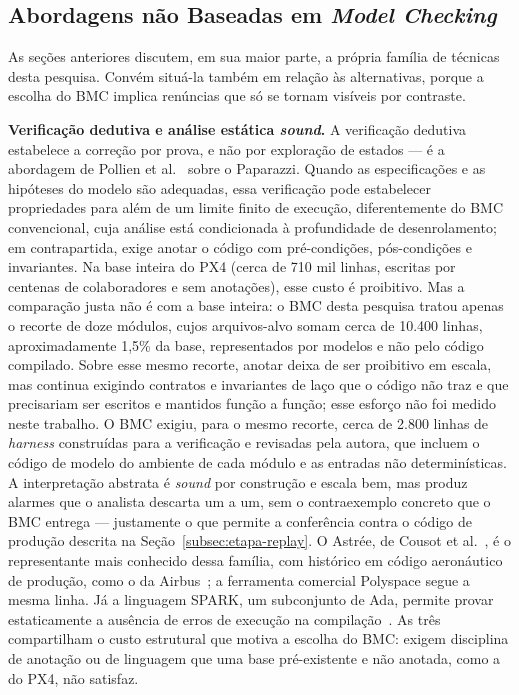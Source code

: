 \subsection{Abordagens não Baseadas em \textit{Model Checking}}
\label{subsec:rel-nao-bmc}

As seções anteriores discutem, em sua maior parte, a própria família de técnicas
desta pesquisa. Convém situá-la também em relação às alternativas, porque a
escolha do BMC implica renúncias que só se tornam visíveis por contraste.

\textbf{Verificação dedutiva e análise estática \textit{sound}.} A verificação
dedutiva estabelece a correção por prova, e não por exploração de estados --- é a
abordagem de Pollien et al.~\cite{Pollien2021} sobre o Paparazzi. Quando as
especificações e as hipóteses do modelo são adequadas, essa verificação pode
estabelecer propriedades para além de um limite finito de execução, diferentemente
do BMC convencional, cuja análise está condicionada à profundidade de
desenrolamento; em contrapartida, exige anotar o código com pré-condições,
pós-condições e invariantes. Na base inteira do PX4 (cerca de 710 mil linhas, escritas
por centenas de colaboradores e sem anotações), esse custo é proibitivo. Mas a
comparação justa não é com a base inteira: o BMC desta pesquisa tratou apenas o
recorte de doze módulos, cujos arquivos-alvo somam cerca de 10.400 linhas, aproximadamente 1,5\%
da base, representados por modelos e não pelo código compilado. Sobre esse mesmo recorte, anotar deixa de ser proibitivo em escala, mas
continua exigindo contratos e invariantes de laço que o código não traz e que
precisariam ser escritos e mantidos função a função; esse esforço não foi medido
neste trabalho. O BMC exigiu, para o mesmo recorte, cerca de 2.800 linhas de
\textit{harness} construídas para a verificação e revisadas pela autora, que incluem o código de modelo do ambiente de cada
módulo e as entradas não determinísticas. A interpretação abstrata é \textit{sound} por
construção e escala bem, mas produz alarmes que o analista descarta um a um, sem
o contraexemplo concreto que o BMC entrega --- justamente o que permite a
conferência contra o código de produção descrita na
Seção~\ref{subsec:etapa-replay}. O Astrée, de Cousot et
al.~\cite{Cousot2005Astree}, é o representante mais conhecido dessa família, com
histórico em código aeronáutico de produção, como o da Airbus~\cite{Bertrane2010};
a ferramenta comercial Polyspace segue a mesma linha. Já a linguagem SPARK, um
subconjunto de Ada, permite provar estaticamente a ausência de erros de execução
na compilação~\cite{McCormick2015}. As três compartilham o custo estrutural que
motiva a escolha do BMC: exigem disciplina de anotação ou de linguagem que uma
base pré-existente e não anotada, como a do PX4, não satisfaz.

